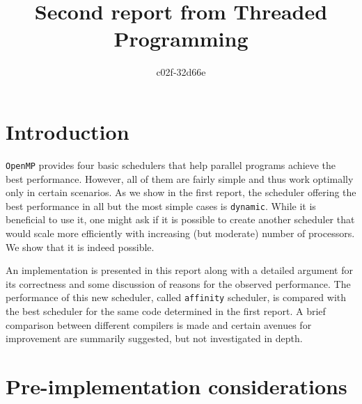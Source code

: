 \documentclass[11pt,a4paper]{article}
\begin{document}
\title{Second report from Threaded Programming}
\author{c02f-32d66e}
\maketitle

\section{Introduction}
\texttt{OpenMP} provides four basic schedulers that help parallel programs achieve the best performance. However, all of them are fairly simple and thus work optimally only in certain scenarios. As we show in the first report, the scheduler offering the best performance in all but the most simple cases is \texttt{dynamic}. While it is beneficial to use it, one might ask if it is possible to create another scheduler that would scale more efficiently with increasing (but moderate) number of processors. We show that it is indeed possible.

An implementation is presented in this report along with a detailed argument for its correctness and some discussion of reasons for the observed performance. The performance of this new scheduler, called \texttt{affinity} scheduler, is compared with the best scheduler for the same code determined in the first report. A brief comparison between different compilers is made and certain avenues for improvement are summarily suggested, but not investigated in depth.

\section{Pre-implementation considerations}
\end{document}
